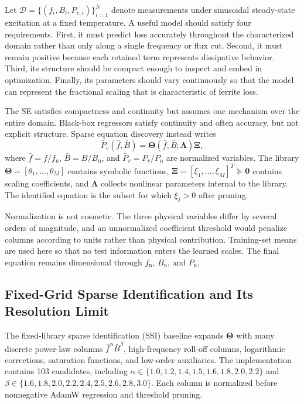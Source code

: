 \documentclass[lettersize,journal]{IEEEtran}
\newcommand{\fbar}{\bar{f}}
\newcommand{\Bbar}{\bar{B}}
\newcommand{\Pbar}{\bar{P}_{v}}
\newcommand{\vect}[1]{\boldsymbol{#1}}
\begin{document}
Let $\mathcal{D}=\{(f_i,B_i,P_{v,i})\}_{i=1}^{N}$ denote measurements under sinusoidal steady-state excitation at a fixed temperature. A useful model should satisfy four requirements. First, it must predict loss accurately throughout the characterized domain rather than only along a single frequency or flux cut. Second, it must remain positive because each retained term represents dissipative behavior. Third, its structure should be compact enough to inspect and embed in optimization. Finally, its parameters should vary continuously so that the model can represent the fractional scaling that is characteristic of ferrite loss.

The SE satisfies compactness and continuity but assumes one mechanism over the entire domain. Black-box regressors satisfy continuity and often accuracy, but not explicit structure. Sparse equation discovery instead writes
\begin{equation}
 \Pbar(\fbar,\Bbar)=\vect{\Theta}(\fbar,\Bbar;\vect{\Lambda})\vect{\Xi},
 \label{eq:general}
\end{equation}
where $\fbar=f/f_{\mathrm{n}}$, $\Bbar=B/B_{\mathrm{n}}$, and $\Pbar=P_v/P_{\mathrm{n}}$ are normalized variables. The library $\vect{\Theta}=[\theta_1,\ldots,\theta_M]$ contains symbolic functions, $\vect{\Xi}=[\xi_1,\ldots,\xi_M]^T\succeq\vect{0}$ contains scaling coefficients, and $\vect{\Lambda}$ collects nonlinear parameters internal to the library. The identified equation is the subset for which $\xi_j>0$ after pruning.

Normalization is not cosmetic. The three physical variables differ by several orders of magnitude, and an unnormalized coefficient threshold would penalize columns according to units rather than physical contribution. Training-set means are used here so that no test information enters the learned scales. The final equation remains dimensional through $f_{\mathrm{n}}$, $B_{\mathrm{n}}$, and $P_{\mathrm{n}}$.

\subsection{Fixed-Grid Sparse Identification and Its Resolution Limit}

The fixed-library sparse identification (SSI) baseline expands $\vect{\Theta}$ with many discrete power-law columns $\fbar^{\alpha}\Bbar^{\beta}$, high-frequency roll-off columns, logarithmic corrections, saturation functions, and low-order auxiliaries. The implementation contains 103 candidates, including $\alpha\in\{1.0,1.2,1.4,1.5,1.6,1.8,2.0,2.2\}$ and $\beta\in\{1.6,1.8,2.0,2.2,2.4,2.5,2.6,2.8,3.0\}$. Each column is normalized before nonnegative AdamW regression and threshold pruning.
\end{document}
